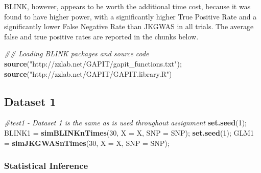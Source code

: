 \documentclass[
]{article}
\newenvironment{Shaded}{\begin{snugshade}}{\end{snugshade}}
\newcommand{\CommentTok}[1]{\textcolor[rgb]{0.56,0.35,0.01}{\textit{#1}}}
\newcommand{\DataTypeTok}[1]{\textcolor[rgb]{0.13,0.29,0.53}{#1}}
\newcommand{\DecValTok}[1]{\textcolor[rgb]{0.00,0.00,0.81}{#1}}
\newcommand{\KeywordTok}[1]{\textcolor[rgb]{0.13,0.29,0.53}{\textbf{#1}}}
\newcommand{\NormalTok}[1]{#1}
\newcommand{\OperatorTok}[1]{\textcolor[rgb]{0.81,0.36,0.00}{\textbf{#1}}}
\newcommand{\StringTok}[1]{\textcolor[rgb]{0.31,0.60,0.02}{#1}}
\begin{document}
BLINK, however, appears to be worth the additional time cost, because it
was found to have higher power, with a significantly higher True
Positive Rate and a significantly lower False Negative Rate than JKGWAS
in all trials. The average false and true positive rates are reported in
the chunks below.

\begin{Shaded}
\begin{Highlighting}[]
\CommentTok{\#\# Loading BLINK packages and source code}
\KeywordTok{source}\NormalTok{(}\StringTok{"http://zzlab.net/GAPIT/gapit\_functions.txt"}\NormalTok{);}
\KeywordTok{source}\NormalTok{(}\StringTok{"http://zzlab.net/GAPIT/GAPIT.library.R"}\NormalTok{)}
\end{Highlighting}
\end{Shaded}

\hypertarget{dataset-1}{%
\subsection{Dataset 1}\label{dataset-1}}

\begin{Shaded}
\begin{Highlighting}[]
\CommentTok{\#test1 {-} Dataset 1 is the same as is used throughout assignment}
\KeywordTok{set.seed}\NormalTok{(}\DecValTok{1}\NormalTok{);}
\NormalTok{BLINK1 =}\StringTok{ }\KeywordTok{simBLINKnTimes}\NormalTok{(}\DecValTok{30}\NormalTok{, }\DataTypeTok{X =}\NormalTok{ X, }\DataTypeTok{SNP =}\NormalTok{ SNP);}
\KeywordTok{set.seed}\NormalTok{(}\DecValTok{1}\NormalTok{);}
\NormalTok{GLM1 =}\StringTok{ }\KeywordTok{simJKGWASnTimes}\NormalTok{(}\DecValTok{30}\NormalTok{, }\DataTypeTok{X =}\NormalTok{ X, }\DataTypeTok{SNP =}\NormalTok{ SNP);}
\end{Highlighting}
\end{Shaded}

\hypertarget{statistical-inference-1}{%
\subsubsection{Statistical Inference}\label{statistical-inference-1}}

\begin{Shaded}
\end{Shaded}
\end{document}
